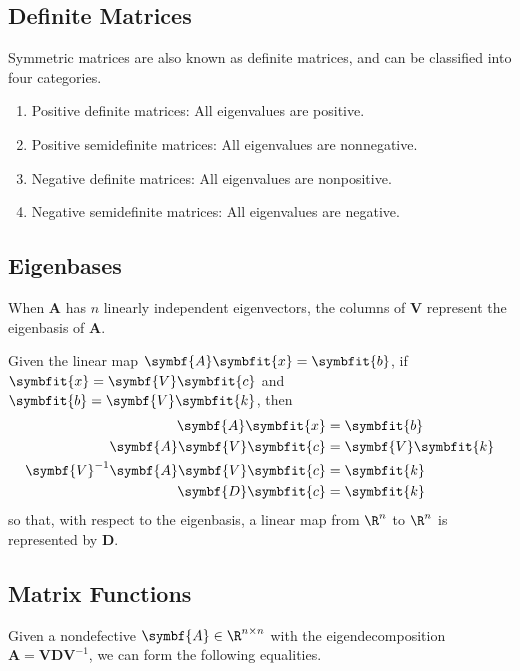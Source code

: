 \documentclass{article}
\begin{document}
\subsection{Definite Matrices}
Symmetric matrices are also known as definite matrices, and can be classified into four categories.
\begin{enumerate}
    \item Positive definite matrices: All eigenvalues are positive.
    \item Positive semidefinite matrices: All eigenvalues are nonnegative.
    \item Negative definite matrices: All eigenvalues are nonpositive.
    \item Negative semidefinite matrices: All eigenvalues are negative.
\end{enumerate}
\subsection{Eigenbases}
When \(\symbf{A}\) has \(n\) linearly independent eigenvectors, the columns of \(\symbf{V}\) represent the eigenbasis of \(\symbf{A}\).

Given the linear map \(\symbf{A}\symbfit{x} = \symbfit{b}\), if \(\symbfit{x} = \symbf{V} \symbfit{c}\) and \(\symbfit{b} = \symbf{V} \symbfit{k}\),
then
\begin{align*}
    \symbf{A} \symbfit{x}                          & = \symbfit{b}           \\
    \symbf{A} \symbf{V} \symbfit{c}                & = \symbf{V} \symbfit{k} \\
    \symbf{V}^{-1} \symbf{A} \symbf{V} \symbfit{c} & = \symbfit{k}           \\
    \symbf{D} \symbfit{c}                          & = \symbfit{k}
\end{align*}
so that, with respect to the eigenbasis, a linear map from \(\R^n\) to \(\R^n\) is represented by \(\symbf{D}\).
\subsection{Matrix Functions}
Given a nondefective \(\symbf{A} \in \R^{n \times n}\) with the eigendecomposition \(\symbf{A} = \symbf{V} \symbf{D} \symbf{V}^{-1}\),
we can form the following equalities.
\end{document}
